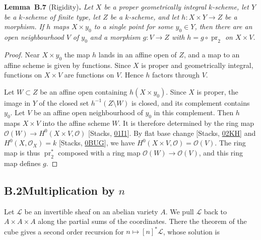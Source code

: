\documentclass[11pt]{article}
\newenvironment{bpstatement}[2]{\par\addvspace{0.6\baselineskip}\noindent\textbf{#1}#2\textbf{.}\enspace\ignorespaces}
  {\par\addvspace{0.4\baselineskip}}
\newenvironment{bpstatementit}[2]{\begin{bpstatement}{#1}{#2}\itshape\ignorespaces}{\end{bpstatement}}
\begin{document}
\label{bp20}%
\begin{bpstatementit}{Lemma~B.7}{ (Rigidity)}
Let \(X\) be a proper geometrically integral \(k\)-scheme, let \(Y\) be a \(k\)-scheme of finite type, let \(Z\) be a \(k\)-scheme, and let \(h:X\times Y\to Z\) be a morphism. If \(h\) maps \(X\times y_0\) to a single point for some \(y_0\in Y\), then there are an open neighbourhood \(V\) of \(y_0\) and a morphism \(g:V\to Z\) with \(h=g\circ\operatorname{pr}_2\) on \(X\times V\).
\end{bpstatementit}

\begin{proof}[{Proof}]\label{bp21}%
Near \(X\times y_0\) the map \(h\) lands in an affine open of \(Z\), and a map to an affine scheme is given by functions. Since \(X\) is proper and geometrically integral, functions on \(X\times V\) are functions on \(V\). Hence \(h\) factors through \(V\).

Let \(W\subset Z\) be an affine open containing \(h(X\times y_0)\). Since \(X\) is proper, the image in \(Y\) of the closed set \(h^{-1}(Z\setminus W)\) is closed, and its complement contains \(y_0\). Let \(V\) be an affine open neighbourhood of \(y_0\) in this complement. Then \(h\) maps \(X\times V\) into the affine scheme \(W\). It is therefore determined by the ring map \(\mathcal O(W)\to H^0(X\times V,\mathcal O)\) [Stacks, \href{https://stacks.math.columbia.edu/tag/01I1}{01I1}]. By flat base change [Stacks, \href{https://stacks.math.columbia.edu/tag/02KH}{02KH}] and \(H^0(X,\mathcal O_X)=k\) [Stacks, \href{https://stacks.math.columbia.edu/tag/0BUG}{0BUG}], we have \(H^0(X\times V,\mathcal O)=\mathcal O(V)\). The ring map is thus \(\operatorname{pr}_2^*\) composed with a ring map \(\mathcal O(W)\to\mathcal O(V)\), and this ring map defines \(g\).
\end{proof}


\subsection*{\texorpdfstring{B.2\quad Multiplication by $n$}{B.2 Multiplication by n}}
\label{bp22}%
\label{bp23}%
Let \(\mathcal L\) be an invertible sheaf on an abelian variety \(A\). We pull \(\mathcal L\) back to \(A\times A\times A\) along the partial sums of the coordinates. There the theorem of the cube gives a second order recursion for \(n\mapsto[n]^*\mathcal L\), whose solution is
\end{document}

